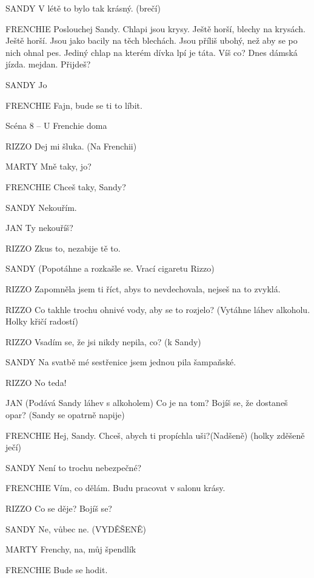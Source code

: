 SANDY        V létě to bylo tak krásný. (brečí)

FRENCHIE         Poslouchej Sandy. Chlapi jsou krysy. Ještě horší, blechy na krysách.                 Ještě horší. Jsou jako bacily na těch blechách. Jsou příliš ubohý, než aby         se po nich ohnal pes. Jediný chlap na kterém dívka lpí je táta. Víš co?         Dnes dámská jízda. mejdan. Přijdeš?

SANDY        Jo

FRENCHIE         Fajn, bude se ti to líbit. 

Scéna 8 – U Frenchie doma 

RIZZO                Dej mi šluka. (Na Frenchii)

MARTY                Mně taky, jo? 

FRENCHIE                Chceš taky, Sandy?

SANDY                Nekouřím.

JAN                Ty nekouříš?

RIZZO                Zkus to, nezabije tě to.

SANDY                (Popotáhne a rozkašle se. Vrací cigaretu Rizzo)

RIZZO                Zapomněla jsem ti říct, abys to nevdechovala, nejseš na to zvyklá.

RIZZO                Co takhle trochu ohnivé vody, aby se to rozjelo? (Vytáhne                                 láhev alkoholu. Holky křičí radostí)

RIZZO                Vsadím se, že jsi nikdy nepila, co? (k Sandy)

SANDY                Na svatbě mé sestřenice jsem jednou pila šampaňské.

RIZZO                No teda!

JAN                (Podává Sandy láhev s alkoholem) Co je na tom? Bojíš se, že dostaneš                 opar? (Sandy se opatrně napije)

FRENCHIE        Hej, Sandy. Chceš, abych ti propíchla uši?(Nadšeně) (holky zděšeně ječí) 

SANDY        Není to trochu nebezpečné?

FRENCHIE        Vím, co dělám. Budu pracovat v salonu krásy.

RIZZO        Co se děje? Bojíš se?

SANDY        Ne, vůbec ne. (VYDĚŠENĚ)

MARTY        Frenchy, na, můj špendlík

FRENCHIE        Bude se hodit. 

